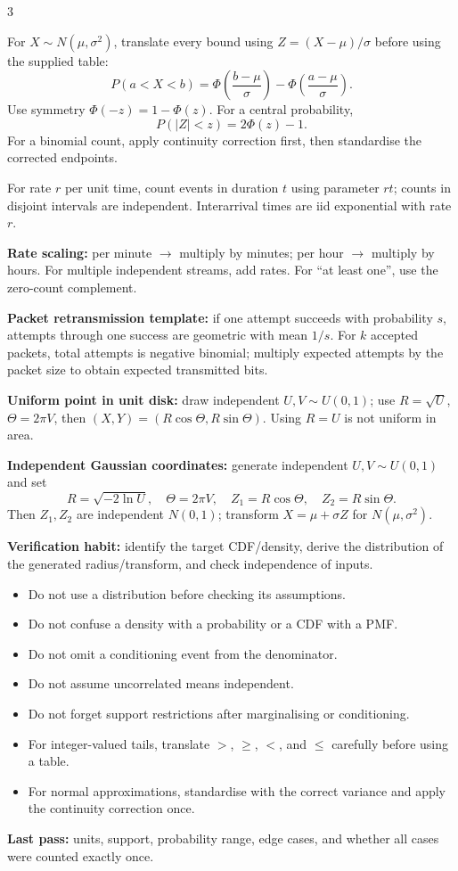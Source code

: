\documentclass[10pt]{article}
\newcommand{\boxstart}[1]{\begin{tcolorbox}[title={#1},sharp corners]}
\newcommand{\boxend}{\end{tcolorbox}}
\begin{document}
\begin{multicols*}{3}
	\boxstart{L6 — Normal calculation template}
	For $X\sim N(\mu,\sigma^2)$, translate every bound using $Z=(X-\mu)/\sigma$ before using the supplied table:
	\[
		P(a<X<b)=\Phi\!\left(\frac{b-\mu}{\sigma}\right)-\Phi\!\left(\frac{a-\mu}{\sigma}\right).
	\]
	Use symmetry $\Phi(-z)=1-\Phi(z)$. For a central probability,
	\[
		P(|Z|<z)=2\Phi(z)-1.
	\]
	For a binomial count, apply continuity correction first, then standardise the corrected endpoints.
	\boxend

	\boxstart{L5/L6 — Poisson-process applications}
	For rate $r$ per unit time, count events in duration $t$ using parameter $rt$; counts in disjoint intervals are independent. Interarrival times are iid exponential with rate $r$.

	\textbf{Rate scaling:} per minute $\to$ multiply by minutes; per hour $\to$ multiply by hours. For multiple independent streams, add rates. For ``at least one'', use the zero-count complement.

	\textbf{Packet retransmission template:} if one attempt succeeds with probability $s$, attempts through one success are geometric with mean $1/s$. For $k$ accepted packets, total attempts is negative binomial; multiply expected attempts by the packet size to obtain expected transmitted bits.
	\boxend

	\boxstart{L6 — Simulation recipes from lecture}
	\textbf{Uniform point in unit disk:} draw independent $U,V\sim U(0,1)$; use $R=\sqrt U$, $\Theta=2\pi V$, then $(X,Y)=(R\cos\Theta,R\sin\Theta)$. Using $R=U$ is not uniform in area.

	\textbf{Independent Gaussian coordinates:} generate independent $U,V\sim U(0,1)$ and set
	\[
		R=\sqrt{-2\ln U},\quad\Theta=2\pi V,\quad
		Z_1=R\cos\Theta,\quad Z_2=R\sin\Theta.
	\]
	Then $Z_1,Z_2$ are independent $N(0,1)$; transform $X=\mu+\sigma Z$ for $N(\mu,\sigma^2)$.

	\textbf{Verification habit:} identify the target CDF/density, derive the distribution of the generated radius/transform, and check independence of inputs.
	\boxend

	\boxstart{L1–L6 — Exam traps and final checks}
	\begin{itemize}
		\item Do not use a distribution before checking its assumptions.
		\item Do not confuse a density with a probability or a CDF with a PMF.
		\item Do not omit a conditioning event from the denominator.
		\item Do not assume uncorrelated means independent.
		\item Do not forget support restrictions after marginalising or conditioning.
		\item For integer-valued tails, translate $>$, $\ge$, $<$, and $\le$ carefully before using a table.
		\item For normal approximations, standardise with the correct variance and apply the continuity correction once.
	\end{itemize}
	\textbf{Last pass:} units, support, probability range, edge cases, and whether all cases were counted exactly once.
	\boxend

\end{multicols*}
\end{document}
